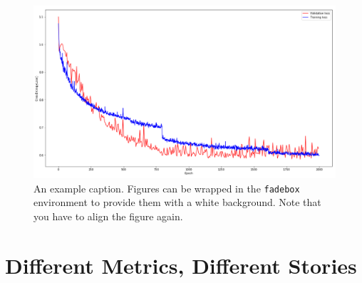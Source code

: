\documentclass[
]{dtuposter}
\begin{document}
\begin{dtupostercontent}

\begin{figure}
	\begin{fadebox}\begin{center}
			\includegraphics[width=\linewidth,origin=c]{loss}
	\end{center}\end{fadebox}
	\caption{An example caption. Figures can be wrapped in the \texttt{fadebox} 
		environment to provide them with a white background. Note that you have to align the 
		figure again.}\label{fig:example2}
\end{figure}


\section{Different Metrics, Different Stories}







\end{dtupostercontent}
\end{document}
